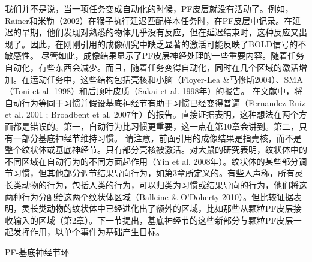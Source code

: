 我们并不是说，当一项任务变成自动化的时候，PF皮层就没有活动了。例如，Rainer和米勒（2002）在猴子执行延迟匹配样本任务时，在PF皮层中记录。在延迟的早期，他们发现对熟悉的物体几乎没有反应，但在延迟结束时，这种反应又出现了。因此，在刚刚引用的成像研究中缺乏显著的激活可能反映了BOLD信号的不敏感性。
尽管如此，成像结果显示了PF皮层神经处理的一些重要内容。随着任务自动化，有些东西会减少。而且，随着任务变得自动化，同时在几个区域的激活增加。在运动任务中，这些结构包括壳核和小脑（Floyer-Lea \&马修斯2004）、SMA（Toni et al. 1998）和后顶叶皮质（Sakai et al. 1998年）的报告。
在文献中，将自动行为等同于习惯并假设基底神经节有助于习惯已经变得普遍（Fernandez-Ruiz et al. 2001 ; Broadbent et al. 2007年）的报告。直接证据表明，这种想法在两个方面都是错误的。第一，自动行为比习惯更重要，这一点在第10章会讲到。第二，只有一部分基底神经节维持习惯。
请注意，前面引用的成像结果是指壳核，而不是整个纹状体或基底神经节。只有部分壳核被激活。对大鼠的研究表明，纹状体中的不同区域在自动行为的不同方面起作用（Yin et al. 2008年）。纹状体的某些部分调节习惯，但其他部分调节结果导向行为，如第3章所定义的。有些人声称，所有灵长类动物的行为，包括人类的行为，可以归类为习惯或结果导向的行为，他们将这两种行为分配给这两个纹状体区域（Balleine \& O'Doherty 2010）。但比较证据表明，灵长类动物的纹状体中已经进化出了额外的区域，比如那些从颗粒PF皮层接收输入的区域（第2章）。下一节提出，基底神经节的这些新部分与颗粒PF皮层一起发挥作用，以单个事件为基础产生目标。

PF-基底神经节环


